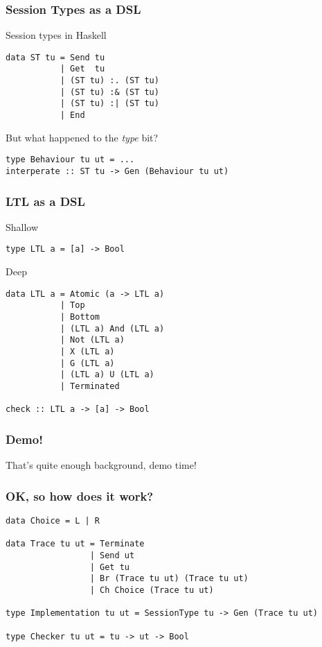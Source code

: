 \documentclass{beamer}
\begin{document}
\begin{frame}[fragile]
    \frametitle{Session Types as a DSL}
    \large{Session types in Haskell}
    \\
    \begin{verbatim}
data ST tu = Send tu
           | Get  tu
           | (ST tu) :. (ST tu)
           | (ST tu) :& (ST tu)
           | (ST tu) :| (ST tu)
           | End
    \end{verbatim}
    \pause
    But what happened to the \textit{type} bit?
    \begin{verbatim}
type Behaviour tu ut = ...
interperate :: ST tu -> Gen (Behaviour tu ut)
    \end{verbatim}
\end{frame}

\begin{frame}[fragile]
    \frametitle{LTL as a DSL}
    \centering
    Shallow
    \begin{verbatim}
type LTL a = [a] -> Bool
    \end{verbatim}
    \pause
    \centering
    Deep
    \begin{verbatim}
data LTL a = Atomic (a -> LTL a)
           | Top 
           | Bottom
           | (LTL a) And (LTL a)
           | Not (LTL a)
           | X (LTL a)
           | G (LTL a)
           | (LTL a) U (LTL a)
           | Terminated

check :: LTL a -> [a] -> Bool
    \end{verbatim}
\end{frame}

\begin{frame}
    \frametitle{Demo!}
    \Large{That's quite enough background, demo time!}
\end{frame}

\begin{frame}[fragile]
    \frametitle{OK, so how does it work?}
    \small{
    \begin{verbatim}
data Choice = L | R

data Trace tu ut = Terminate
                 | Send ut
                 | Get tu
                 | Br (Trace tu ut) (Trace tu ut)
                 | Ch Choice (Trace tu ut)

type Implementation tu ut = SessionType tu -> Gen (Trace tu ut)

type Checker tu ut = tu -> ut -> Bool
    \end{verbatim}
}
\end{frame}
\end{document}
